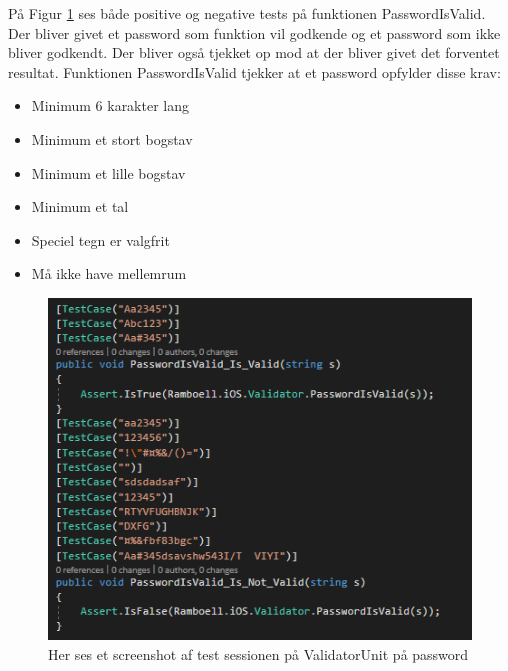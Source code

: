 På Figur \ref{fig:ValidatorUnitPassword} ses både positive og negative tests på funktionen PasswordIsValid. Der bliver givet et password som funktion vil godkende og et password som ikke bliver godkendt. Der bliver også tjekket op mod at der bliver givet det forventet resultat. Funktionen PasswordIsValid tjekker at et password opfylder disse krav: \\
\begin{itemize}
	\item Minimum 6 karakter lang
	\item Minimum et stort bogstav
	\item Minimum et lille bogstav
	\item Minimum et tal
	\item Speciel tegn er valgfrit
	\item Må ikke have mellemrum
\end{itemize}

\begin{figure}[H]
	\centering
	\includegraphics[width=0.6\linewidth]{Unit/ValidatorUnitPassword.PNG}
	\caption{Her ses et screenshot af test sessionen på ValidatorUnit på password}
	\label{fig:ValidatorUnitPassword}
\end{figure}


